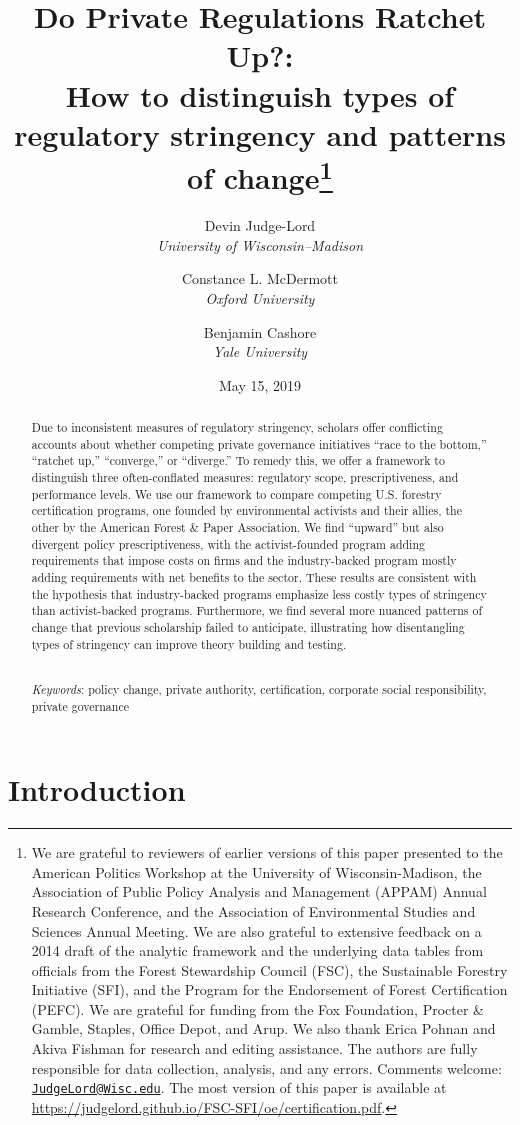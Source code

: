 \documentclass[
      12pt,
            Review ]{article}
\title{Do Private Regulations Ratchet Up?: 
           \\ How to distinguish types of regulatory stringency and patterns of change\thanks{We are grateful to reviewers of earlier versions of this paper presented
to the American Politics Workshop at the University of
Wisconsin-Madison, the Association of Public Policy Analysis and
Management (APPAM) Annual Research Conference, and the Association of
Environmental Studies and Sciences Annual Meeting. We are also grateful
to extensive feedback on a 2014 draft of the analytic framework and the
underlying data tables from officials from the Forest Stewardship
Council (FSC), the Sustainable Forestry Initiative (SFI), and the
Program for the Endorsement of Forest Certification (PEFC). We are
grateful for funding from the Fox Foundation, Procter \& Gamble,
Staples, Office Depot, and Arup. We also thank Erica Pohnan and Akiva
Fishman for research and editing assistance. The authors are fully
responsible for data collection, analysis, and any errors. Comments
welcome:
\href{mailto:JudgeLord@Wisc.edu}{\nolinkurl{JudgeLord@Wisc.edu}}. The
most version of this paper is available at
\url{https://judgelord.github.io/FSC-SFI/oe/certification.pdf}.}}
\author{ %
            Devin Judge-Lord  \\ \emph{University of Wisconsin--Madison} 
             \and 
            Constance L. McDermott  \\ \emph{Oxford University} 
             \and 
            Benjamin Cashore  \\ \emph{Yale University} 
            }
\date{May 15, 2019}
\begin{document}
 


  \maketitle




  \begin{abstract}
    \noindent Due to inconsistent measures of regulatory stringency, scholars offer
conflicting accounts about whether competing private governance
initiatives ``race to the bottom,'' ``ratchet up,'' ``converge,'' or
``diverge.'' To remedy this, we offer a framework to distinguish three
often-conflated measures: regulatory scope, prescriptiveness, and
performance levels. We use our framework to compare competing U.S.
forestry certification programs, one founded by environmental activists
and their allies, the other by the American Forest \& Paper Association.
We find ``upward'' but also divergent policy prescriptiveness, with the
activist-founded program adding requirements that impose costs on firms
and the industry-backed program mostly adding requirements with net
benefits to the sector. These results are consistent with the hypothesis
that industry-backed programs emphasize less costly types of stringency
than activist-backed programs. Furthermore, we find several more nuanced
patterns of change that previous scholarship failed to anticipate,
illustrating how disentangling types of stringency can improve theory
building and testing. 

          \hfill \\ 
      \noindent \emph{Keywords}: policy change, private authority, certification, corporate social
responsibility, private governance 
    
  \end{abstract}










\noindent 
      \doublespacing 
    \newpage

\section{Introduction}\label{introduction}
\end{document}

